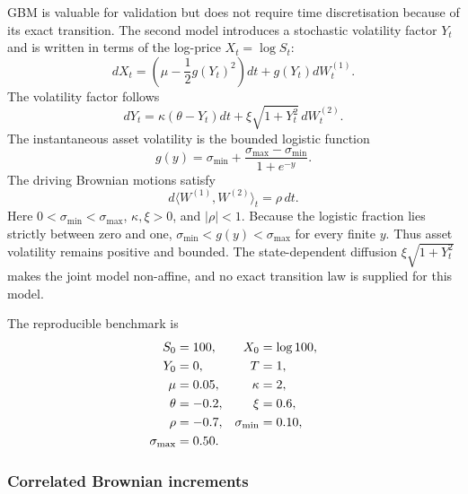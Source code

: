 GBM is valuable for validation but does not require time discretisation because
of its exact transition.  The second model introduces a stochastic volatility
factor $Y_t$ and is written in terms of the log-price $X_t=\log S_t$:
\begin{equation}
    dX_t
      =\left(\mu-\frac12g(Y_t)^2\right)dt
        +g(Y_t)dW_t^{(1)}.
    \label{eq:nonaffine-x}
\end{equation}
The volatility factor follows
\begin{equation}
    dY_t
      =\kappa(\theta-Y_t)dt
        +\xi\sqrt{1+Y_t^2}\,dW_t^{(2)}.
    \label{eq:nonaffine-y}
\end{equation}
The instantaneous asset volatility is the bounded logistic function
\begin{equation}
    g(y)
      =\sigma_{\min}
        +\frac{\sigma_{\max}-\sigma_{\min}}{1+e^{-y}}.
    \label{eq:nonaffine-g}
\end{equation}
The driving Brownian motions satisfy
\begin{equation}
    d\langle W^{(1)},W^{(2)}\rangle_t=\rho\,dt.
    \label{eq:nonaffine-correlation}
\end{equation}
Here $0<\sigma_{\min}<\sigma_{\max}$, $\kappa,\xi>0$, and
$|\rho|<1$.  Because the logistic fraction lies strictly between zero and one,
$\sigma_{\min}<g(y)<\sigma_{\max}$ for every finite $y$.  Thus asset
volatility remains positive and bounded.  The state-dependent diffusion
$\xi\sqrt{1+Y_t^2}$ makes the joint model non-affine, and no exact transition
law is supplied for this model.

The reproducible benchmark is
\begin{align}
    S_0&=100, & X_0&=\log 100, \notag\\
    Y_0&=0, & T&=1, \notag\\
    \mu&=0.05, & \kappa&=2, \notag\\
    \theta&=-0.2, & \xi&=0.6, \notag\\
    \rho&=-0.7, & \sigma_{\min}&=0.10, \notag\\
    \sigma_{\max}&=0.50.
    \label{eq:nonaffine-parameters}
\end{align}

\subsubsection{Correlated Brownian increments}


